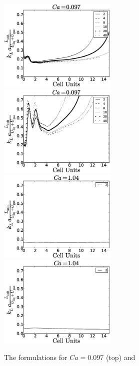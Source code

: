 \documentclass{article}
\begin{document}
\begin{figure}
\includegraphics[width=0.5\textwidth]{Figures/vanbaten_aver_scale_ca097.eps}
\includegraphics[width=0.5\textwidth]{Figures/vanbaten_full_scale_ca097.eps}\\
\includegraphics[width=0.5\textwidth]{Figures/vanbaten_aver_scale_ca14.eps}
\includegraphics[width=0.5\textwidth]{Figures/vanbaten_full_scale_ca14.eps}\\
\caption{The \citet{vanbaten-circular} formulations for $Ca=0.097$ (top) and
}
\end{figure}
\end{document}
